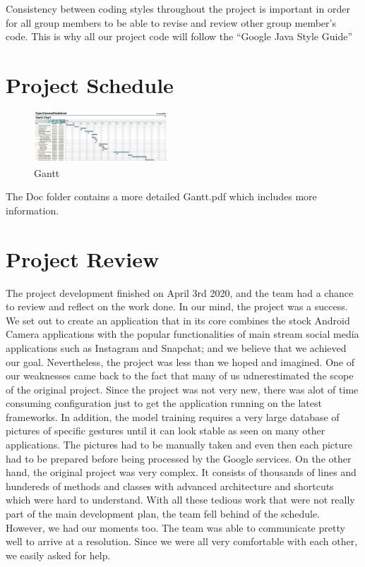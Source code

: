 \documentclass{article}
\begin{document}
Consistency between coding styles throughout the project is important in order for all group members to be able to revise and review other group member’s code. This is why all our project code will follow the “Google Java Style Guide”

\section{Project Schedule}

\begin{figure}[h!]
\centering
\includegraphics[width=50mm, scale = 2]{Gantt}
\caption{Gantt}
\label{fig:method}
\end{figure}
The Doc folder contains a more detailed Gantt.pdf which includes more information. 

\section{Project Review}
{\color{red}
The project development finished on April 3rd 2020, and the team had a chance to review and reflect on the work done. In our mind, the project was a success. We set out to create an application that in its core combines the stock Android Camera applications with the popular functionalities of main stream social media applications such as Instagram and Snapchat; and we believe that we achieved our goal. Nevertheless, the project was less than we hoped and imagined. One of our weaknesses came back to the fact that many of us udnerestimated the scope of the original project. Since the project was not very new, there was alot of time consuming configuration just to get the application running on the latest frameworks. In addition, the model training requires a very large database of pictures of specific gestures until it can look stable as seen on many other applications. The pictures had to be manually taken and even then each picture had to be prepared before being processed by the Google services. On the other hand, the original project was very complex. It consists of thousands of lines and hundereds of methods and classes with advanced architecture and shortcuts which were hard to understand.  With all these tedious work that were not really part of the main development plan, the team fell behind of the schedule. However, we had our moments too. The team was able to communicate pretty well to arrive at a resolution. Since we were all very comfortable with each other, we easily asked for help. 
}
\end{document}
